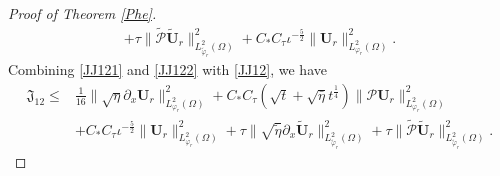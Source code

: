 \documentclass[10pt,a4paper]{amsart}
\begin{document}
\begin{proof}[Proof of Theorem \ref{Phe}]
\begin{align}
     +\tau\|\tilde{\mathcal{P}}\tilde{\mathbf{U}}_{r}\|_{L_{\tilde{\varphi}_{r}}^{2}(\Omega)}^{2}
     +C_{*}C_{\tau}\iota^{-\frac{5}{2}}\|\mathbf{U}_{r}\|_{L_{\varphi_{r}}^{2}(\Omega)}^{2}.\nonumber
\end{align}
Combining \eqref{JJ121} and \eqref{JJ122} with \eqref{JJ12}, we have
\begin{align}\label{JJ12'}
\mathfrak{J}_{12}
\leq& \frac{1}{16}\|\sqrt{\eta}\partial_{x}\mathbf{U}_{r}\|_{L_{\varphi_{r}}^{2}(\Omega)}^{2}
     +C_{*}C_{\tau}(\sqrt{t}+\sqrt{\bar{\eta}}t^{\frac{1}{4}})\|\mathcal{P}\mathbf{U}_{r}\|_{L_{\varphi_{r}}^{2}(\Omega)}^{2}\\
    &+C_{*}C_{\tau}\iota^{-\frac{5}{2}}\|\mathbf{U}_{r}\|_{L_{\varphi_{r}}^{2}(\Omega)}^{2}
     +\tau\|\sqrt{\tilde{\eta}}\partial_{x}\tilde{\mathbf{U}}_{r}\|_{L_{\tilde{\varphi}_{r}}^{2}(\Omega)}^{2}
     +\tau\|\tilde{\mathcal{P}}\tilde{\mathbf{U}}_{r}\|_{L_{\tilde{\varphi}_{r}}^{2}(\Omega)}^{2}.\nonumber
\end{align}


\end{proof}
\end{document}
